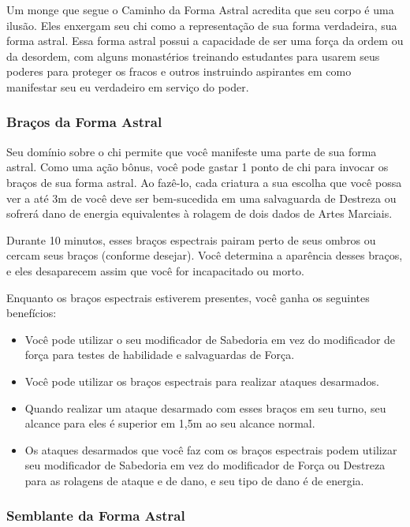 \begin{multicols}{2}
Um monge que segue o Caminho da Forma Astral acredita que seu corpo é uma
ilusão. Eles enxergam seu chi como a representação de sua forma verdadeira, sua
forma astral. Essa forma astral possui a capacidade de ser uma força da ordem ou
da desordem, com alguns monastérios treinando estudantes para usarem seus
poderes para proteger os fracos e outros instruindo aspirantes em como
manifestar seu eu verdadeiro em serviço do poder.

\subsubsection*{Braços da Forma Astral}%
\label{ssub:bracos_da_forma_astral}

Seu domínio sobre o chi permite que você manifeste uma parte de sua forma
astral. Como uma ação bônus, você pode gastar 1 ponto de chi para invocar os
braços de sua forma astral. Ao fazê-lo, cada criatura a sua escolha que você
possa ver a até 3m de você deve ser bem-sucedida em uma salvaguarda de Destreza
ou sofrerá dano de energia equivalentes à rolagem de dois dados de Artes
Marciais.

Durante 10 minutos, esses braços espectrais pairam perto de seus ombros ou
cercam seus braços (conforme desejar). Você determina a aparência desses braços,
e eles desaparecem assim que você for incapacitado ou morto.

Enquanto os braços espectrais estiverem presentes, você ganha os seguintes
benefícios:

\begin{itemize}
    \item Você pode utilizar o seu modificador de Sabedoria em vez do
        modificador de força para testes de habilidade e salvaguardas de Força.
    \item Você pode utilizar os braços espectrais para realizar ataques
        desarmados.
    \item Quando realizar um ataque desarmado com esses braços em seu turno, seu
        alcance para eles é superior em 1,5m ao seu alcance normal.
    \item Os ataques desarmados que você faz com os braços espectrais podem
        utilizar seu modificador de Sabedoria em vez do modificador de Força ou
        Destreza para as rolagens de ataque e de dano, e seu tipo de dano é de
        energia.
\end{itemize}

\subsubsection*{Semblante da Forma Astral}%
\label{ssub:semblante_da_forma_astral}


\end{multicols}
